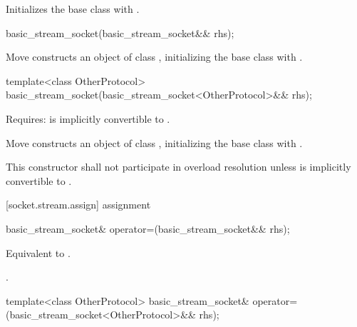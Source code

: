 \begin{itemdescr}
\pnum
\effects Initializes the base class with .
\end{itemdescr}

\begin{itemdecl}
basic_stream_socket(basic_stream_socket&& rhs);
\end{itemdecl}

\begin{itemdescr}
\pnum
\effects Move constructs an object of class , initializing the base class with .
\end{itemdescr}

\begin{itemdecl}
template<class OtherProtocol>
  basic_stream_socket(basic_stream_socket<OtherProtocol>&& rhs);
\end{itemdecl}

\begin{itemdescr}
\pnum
Requires:  is implicitly convertible to .

\pnum
\effects Move constructs an object of class , initializing the base class with .

\pnum
\remarks This constructor shall not participate in overload resolution unless  is implicitly convertible to .
\end{itemdescr}



[socket.stream.assign]{ assignment}

\begin{itemdecl}
basic_stream_socket& operator=(basic_stream_socket&& rhs);
\end{itemdecl}

\begin{itemdescr}
\pnum
\effects Equivalent to .

\pnum
\returns {}.
\end{itemdescr}

\begin{itemdecl}
template<class OtherProtocol>
  basic_stream_socket& operator=(basic_stream_socket<OtherProtocol>&& rhs);
\end{itemdecl}

